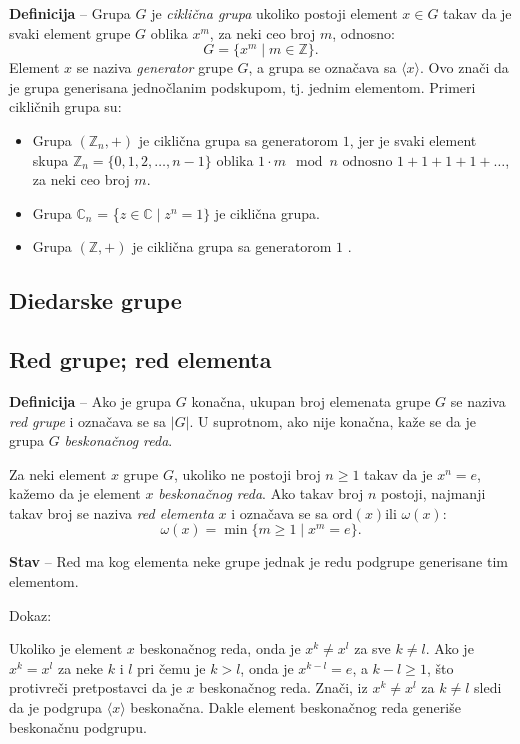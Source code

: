 \documentclass[a4paper,12pt]{article}
\begin{document}
\textbf{Definicija} -- Grupa \( G \) je \emph{ciklična grupa} ukoliko postoji element \( x \in G \) takav da je svaki element grupe \( G \) oblika \( x^m \), za neki ceo broj \( m \), odnosno:
\[G = \{ x^m \mid m \in \mathbb{Z} \}.\]
Element \( x \) se naziva \emph{generator} grupe \( G \), a grupa se označava sa \( \langle x \rangle \). 
Ovo znači da je grupa generisana jednočlanim podskupom, tj. jednim elementom.
Primeri cikličnih grupa su:
\begin{itemize}
  \item Grupa \( (\mathbb{Z}_n, +) \) je ciklična grupa sa generatorom \( 1 \), jer je svaki element skupa \( \mathbb{Z}_n = \{0, 1, 2, \dots, n-1\} \) oblika \( 1 \cdot m \mod n \text{ odnosno } 1 + 1 + 1 + 1 + \dots\), za neki ceo broj \( m \).
  \item Grupa \( \mathbb{C}_n\) = \{\( z \in \mathbb{C} \mid z^n = 1 \} \) je ciklična grupa.
  \item Grupa \( (\mathbb{Z}, +) \) je ciklična grupa sa generatorom \( 1 \) .
\end{itemize}

\subsection{Diedarske grupe}

\subsection{Red grupe; red elementa}

\textbf{Definicija} -- Ako je grupa \( G \) konačna, ukupan broj elemenata grupe \( G \) se naziva \emph{red grupe} i označava se sa \( |G| \).
U suprotnom, ako nije konačna, kaže se da je grupa \( G \) \emph{beskonačnog reda}.

Za neki element \( x \) grupe \( G\), ukoliko ne postoji broj \( n \geq 1 \) takav da je \( x^n = e \), kažemo da je element \( x \) \emph{beskonačnog reda}.
Ako takav broj \( n \) postoji, najmanji takav broj se naziva \emph{red elementa} \( x \) i označava se sa \( \text{ord}(x) \text{ili } \omega(x) \):
\[ \omega(x) = \min \{ m \geq 1\mid x^m = e \}. \]

\medskip
\textbf{Stav} -- Red ma kog elementa neke grupe jednak je redu podgrupe generisane tim elementom.

Dokaz:

Ukoliko je element \( x \) beskonačnog reda, onda je \( x^k \neq x^l \) za sve \(k \neq l \). Ako je \( x^k = x^l \)
za neke $k$ i $l$ pri čemu je \( k > l \), onda je \( x^{k-l} = e \), a \( k - l \geq 1 \), što protivreči pretpostavci da je $x$ beskonačnog reda.
Znači, iz  \( x^k \neq x^l \) za \( k \neq l \) sledi da je podgrupa \( \langle x \rangle \) beskonačna. Dakle element beskonačnog reda generiše beskonačnu podgrupu.
\end{document}
